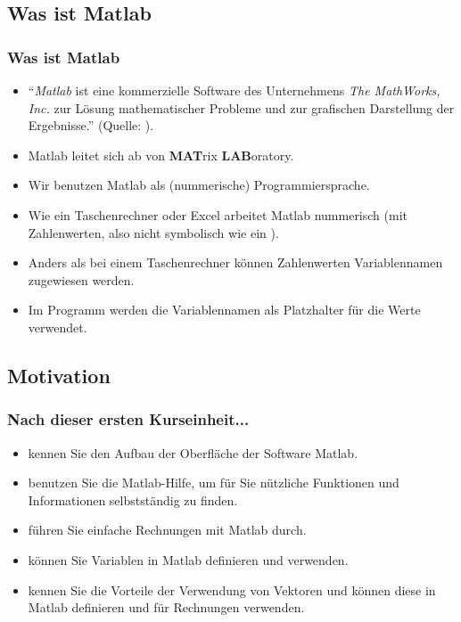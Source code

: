    \subsection{Was ist Matlab}
    \begin{frame}
        \frametitle{Was ist Matlab}

        \begin{itemize}
          \item ``\emph{Matlab} ist eine kommerzielle Software des Unternehmens \emph{The MathWorks, Inc.} zur Lösung mathematischer Probleme
          und zur grafischen Darstellung der Ergebnisse.'' (Quelle: ).
          \item Matlab leitet sich ab von \textbf{MAT}rix \textbf{LAB}oratory.
          \item Wir benutzen Matlab als (nummerische) Programmiersprache.
          \item Wie ein Taschenrechner oder Excel arbeitet Matlab nummerisch (mit Zahlenwerten, also nicht symbolisch wie
          ein ).
          \item Anders als bei einem Taschenrechner können Zahlenwerten Variablennamen zugewiesen werden.
          \item Im Programm werden die Variablennamen als Platzhalter für die Werte verwendet.
        \end{itemize}
    \end{frame}

    \subsection{Motivation}
    \begin{frame}
        \frametitle{Nach dieser ersten Kurseinheit...}

        \begin{itemize}
          \itemsep0.3cm
          \item kennen Sie den Aufbau der Oberfläche der Software Matlab.
          \item benutzen Sie die Matlab-Hilfe, um für Sie nützliche Funktionen und Informationen selbstständig zu finden.
          \item führen Sie einfache Rechnungen mit Matlab durch.
          \item können Sie Variablen in Matlab definieren und verwenden.
          \item kennen Sie die Vorteile der Verwendung von Vektoren und können diese in Matlab definieren und für Rechnungen verwenden.
        \end{itemize}
    \end{frame}

